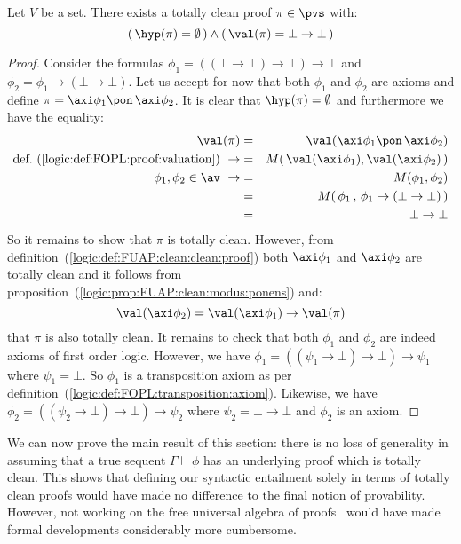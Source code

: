 \begin{lemma}\label{logic:lemma:FUAP:clean:bot:bot}
Let $V$ be a set. There exists a totally clean proof $\pi\in\pvs$
with:
    \[
    (\,\hyp(\pi)=\emptyset\,)\land(\,\val(\pi)=\bot\to\bot\,)
    \]
\end{lemma}
\begin{proof}
Consider the formulas $\phi_{1}=((\bot\to\bot)\to\bot)\to\bot$ and
$\phi_{2}=\phi_{1}\to(\bot\to\bot)$. Let us accept for now that both
$\phi_{1}$ and $\phi_{2}$ are axioms and define $\pi=\axi
\phi_{1}\pon\,\axi\phi_{2}$. It is clear that $\hyp(\pi)=\emptyset$
and furthermore we have the equality:
    \begin{eqnarray*}
    \val(\pi)&=&\val(\axi\phi_{1}\pon\,\axi\phi_{2})\\
    \mbox{def.~(\ref{logic:def:FOPL:proof:valuation})}\ \rightarrow
    &=&M(\,\val(\axi\phi_{1}),\val(\axi\phi_{2})\,)\\
    \phi_{1},\phi_{2}\in\av\ \rightarrow&=&M(\phi_{1},\phi_{2})\\
    &=&M(\,\phi_{1}\,,\,\phi_{1}\to(\bot\to\bot)\,)\\
    &=&\bot\to\bot
    \end{eqnarray*}
So it remains to show that $\pi$ is totally clean. However, from
definition~(\ref{logic:def:FUAP:clean:clean:proof}) both
$\axi\phi_{1}$ and $\axi\phi_{2}$ are totally clean and it follows
from proposition~(\ref{logic:prop:FUAP:clean:modus:ponens}) and:
    \[
    \val(\axi\phi_{2})=\val(\axi\phi_{1})\to\val(\pi)
    \]
that $\pi$ is also totally clean. It remains to check that both
$\phi_{1}$ and $\phi_{2}$ are indeed axioms of first order logic.
However, we have $\phi_{1}=((\psi_{1}\to\bot)\to\bot)\to\psi_{1}$
where $\psi_{1}=\bot$. So $\phi_{1}$ is a transposition axiom as per
definition~(\ref{logic:def:FOPL:transposition:axiom}). Likewise, we
have $\phi_{2}=((\psi_{2}\to\bot)\to\bot)\to\psi_{2}$ where
$\psi_{2}=\bot\to\bot$ and $\phi_{2}$ is an axiom.
\end{proof}

We can now prove the main result of this section: there is no loss
of generality in assuming that a true sequent $\Gamma\vdash\phi$ has
an underlying proof which is totally clean. This shows that defining
our syntactic entailment solely in terms of totally clean proofs
would have made no difference to the final notion of provability.
However, not working on the free universal algebra of proofs \pvs\
would have made formal developments considerably more cumbersome.


